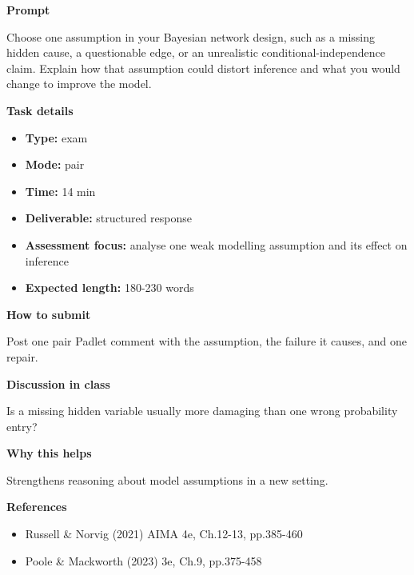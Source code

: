 \documentclass[11pt]{article}
\begin{document}
\begin{tcolorbox}[colback=white,colframe=MidnightBlue,title={Q5 Exam-Style Constructed Response},fonttitle=\bfseries,breakable]
\begin{center}
\end{center}

{\large\bfseries\color{MidnightBlue} Prompt}\par\medskip
Choose one assumption in your Bayesian network design, such as a missing hidden cause, a questionable edge, or an unrealistic conditional-independence claim. Explain how that assumption could distort inference and what you would change to improve the model.

{\large\bfseries\color{MidnightBlue} Task details}\par\medskip
\begin{itemize}\item \textbf{Type:} exam
\item \textbf{Mode:} pair
\item \textbf{Time:} 14 min
\item \textbf{Deliverable:} structured response
\item \textbf{Assessment focus:} analyse one weak modelling assumption and its effect on inference
\item \textbf{Expected length:} 180-230 words\end{itemize}

{\large\bfseries\color{MidnightBlue} How to submit}\par\medskip
Post one pair Padlet comment with the assumption, the failure it causes, and one repair.

{\large\bfseries\color{MidnightBlue} Discussion in class}\par\medskip
Is a missing hidden variable usually more damaging than one wrong probability entry?

{\large\bfseries\color{MidnightBlue} Why this helps}\par\medskip
Strengthens reasoning about model assumptions in a new setting.

{\large\bfseries\color{MidnightBlue} References}\par\medskip
\begin{itemize}\item Russell \& Norvig (2021) AIMA 4e, Ch.12-13, pp.385-460
\item Poole \& Mackworth (2023) 3e, Ch.9, pp.375-458\end{itemize}
\end{tcolorbox}
\end{document}
